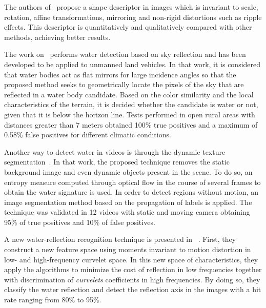 The authors of~\cite{Zhang2010b} propose a shape descriptor in images which is invariant to scale, rotation, affine transformations, mirroring and non-rigid distortions such as ripple effects.
This descriptor is quantitatively and qualitatively compared with other methods,
achieving better results.

The work on~\cite{Rankin2011a} performs water detection based on sky reflection and has been developed to be applied to unmanned land vehicles.
In that work, it is considered that water bodies act as flat mirrors for large incidence angles so that the proposed method seeks to geometrically locate the pixels of the sky that are reflected in a water body candidate.
Based on the color similarity and the local characteristics of the terrain,
it is decided whether the candidate is water or not, given that it is below the horizon line.
Tests performed in open rural areas with distances greater than 7 meters obtained 100\% true positives and a maximum of 0.58\% false positives for different climatic conditions.

Another way to detect water in videos is through the dynamic texture segmentation~\cite{Santana2012a}.
In that work, the proposed technique removes the static background image and even dynamic objects present in the scene.
To do so, an entropy measure computed through optical flow in the course of several frames to obtain the water signature is used.
In order to detect regions without motion, an image segmentation method based on the propagation of labels is applied.
The technique was validated in 12 videos with static and moving camera obtaining 95\% of true positives and 10\% of false positives.

A new water-reflection recognition technique is presented in ~\cite{Zhong2013a}.
First, they construct a new feature space using moments invariant to motion distortion in low- and high-frequency curvelet space.
In this new space of characteristics, they apply the algorithms to minimize the cost of reflection in low frequencies together with discrimination of  {\it curvelets}  coefficients in high frequencies.
By doing so, they classify the water reflection and detect the reflection axis in the images with a hit rate ranging from 80\% to 95\%.

